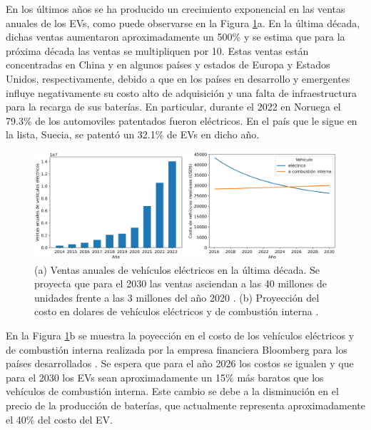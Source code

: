 En los últimos años se ha producido un crecimiento exponencial en las ventas 
anuales de los EVs, como puede observarse en la Figura \ref{fig:evs}a. En la
última década, dichas ventas aumentaron aproximadamente un 500\% y se estima que
para la próxima década las ventas se multipliquen por 10. Estas ventas están 
concentradas en China y en algunos países y estados de Europa y Estados Unidos, 
respectivamente, debido a que en los países en desarrollo y emergentes influye 
negativamente su costo alto de adquisición y una falta de infraestructura para la 
recarga de sus baterías. En particular, durante el 2022 en Noruega el 79.3\% de 
los automoviles patentados fueron eléctricos. En el país que le sigue en la lista,
Suecia, se patentó un 32.1\% de EVs en dicho año.
\begin{figure}[h!]
    \centering
    \includegraphics[width=\textwidth]{Introduccion/energia/evs.png}
    \caption{(a) Ventas anuales de vehículos eléctricos en la última década. Se 
    proyecta que para el 2030 las ventas asciendan a las 40 millones de unidades 
    frente a las 3 millones del año 2020 \cite{EVV}. (b) Proyección del costo en 
    dolares de vehículos eléctricos y de combustión interna \cite{BLOOMBERG}.}
    \label{fig:evs}
\end{figure}

En la Figura \ref{fig:evs}b se muestra la poyección en el costo de los vehículos 
eléctricos y de combustión interna realizada por la empresa financiera Bloomberg 
para los países desarrollados \cite{BLOOMBERG}. Se espera que para el año 2026 
los costos se igualen y que para el 2030 los EVs sean aproximadamente un 15\% más
baratos que los vehículos de combustión interna. Este cambio se debe a la 
disminución en el precio de la producción de baterías, que actualmente representa
aproximadamente el 40\% del costo del EV.

